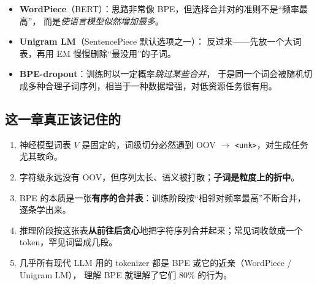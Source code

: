\begin{remark}[同家族的近亲]
\begin{itemize}
    \item \textbf{WordPiece}（BERT）：思路非常像 BPE，但选择合并对的准则不是“频率最高”，
          而是\emph{使语言模型似然增加最多}。
    \item \textbf{Unigram LM}（SentencePiece 默认选项之一）：
          反过来——先放一个大词表，再用 EM 慢慢删除“最没用”的子词。
    \item \textbf{BPE-dropout}：训练时以一定概率\emph{跳过某些合并}，
          于是同一个词会被随机切成多种合理子词序列，相当于一种数据增强，对低资源任务很有用。
\end{itemize}
\end{remark}

\subsection{这一章真正该记住的}

\begin{keypointblock}
\begin{enumerate}
    \item 神经模型词表 $V$ 是固定的，词级切分必然遇到 OOV $\to$ \texttt{<unk>}，对生成任务尤其致命。
    \item 字符级永远没有 OOV，但序列太长、语义被打散；\textbf{子词是粒度上的折中}。
    \item BPE 的本质是一张\textbf{有序的合并表}：训练阶段按“相邻对频率最高”不断合并，逐条学出来。
    \item 推理阶段按这张表\textbf{从前往后贪心}地把字符序列合并起来；常见词收敛成一个 token，罕见词留成几段。
    \item 几乎所有现代 LLM 用的 tokenizer 都是 BPE 或它的近亲（WordPiece / Unigram LM），
          理解 BPE 就理解了它们 80\% 的行为。
\end{enumerate}
\end{keypointblock}
